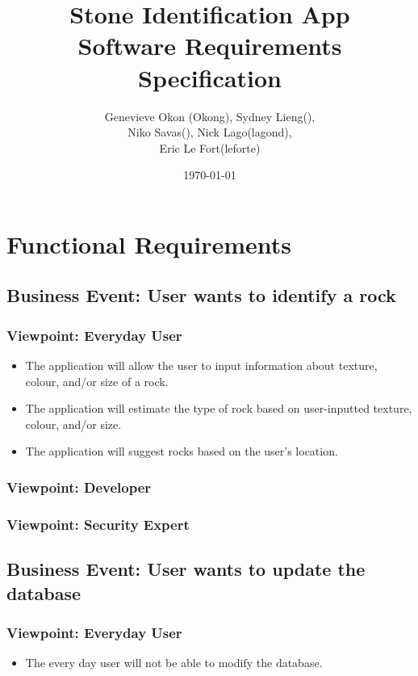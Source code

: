 \documentclass[titlepage]{article}
\begin{document}
\title{Stone Identification App \\
	Software Requirements Specification}
\author{Genevieve Okon (Okong), Sydney Lieng(),\\
	Niko Savas(), Nick Lago(lagond),\\
	Eric Le Fort(leforte)}
\date{\today}
\maketitle

\section{Functional Requirements}
\subsection {Business Event: User wants to identify a rock}
	\subsubsection {Viewpoint: Everyday User}
		\begin{itemize}
			\item The application will allow the user to input information about texture, colour, and/or size of a rock.
			\item The application will estimate the type of rock based on user-inputted texture, colour, and/or size.
			\item The application will suggest rocks based on the user's location.
		\end{itemize}
	\subsubsection {Viewpoint: Developer}
	\subsubsection {Viewpoint: Security Expert}
\subsection {Business Event: User wants to update the database}
	\subsubsection {Viewpoint: Everyday User}
		\begin{itemize}
			\item The every day user will not be able to modify the database.
		\end{itemize}
\end{document}
